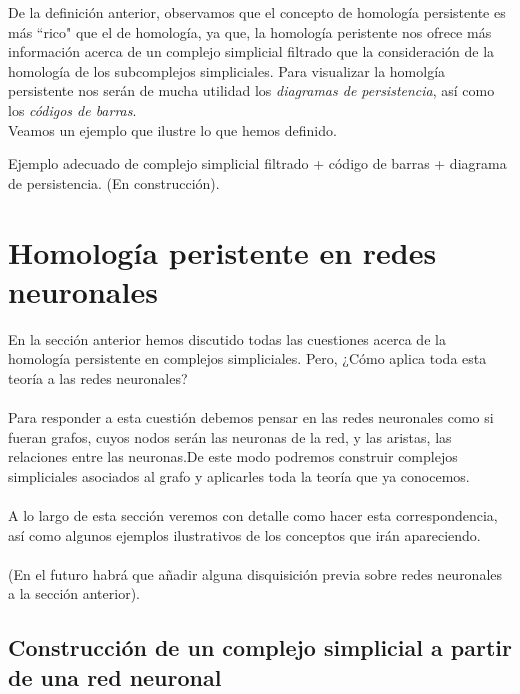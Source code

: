 \documentclass[12pt]{article}
\numberwithin{equation}{section}
\theoremstyle{definition}
\newenvironment{ejem}
  {\pushQED{\qed}\renewcommand{\qedsymbol}{$\blacktriangleleft$}\ejemplo}
  {\popQED\endejemplo}
\theoremstyle{remark}
\theoremstyle{plain}
\begin{document}
		

		De la definición anterior, observamos que el concepto de homología persistente es más ``rico" que el de homología, ya que, la homología peristente nos ofrece más
		información acerca de un complejo simplicial filtrado que la consideración de la homología de los subcomplejos simpliciales. Para visualizar la homolgía persistente
		nos serán de mucha utilidad los \textit{diagramas de persistencia}, así como los \textit{códigos de barras}.\\
		Veamos un ejemplo que ilustre lo que hemos definido.
		
		\begin{ejem}	
			Ejemplo adecuado de complejo simplicial filtrado + código de barras + diagrama de persistencia. (En construcción).
		\end{ejem}

	\section{Homología peristente en redes neuronales}

		En la sección anterior hemos discutido todas las cuestiones 
		acerca de la homología persistente en complejos simpliciales. 
		Pero, ¿Cómo aplica toda esta teoría a las redes neuronales? \\
		\\
		Para responder a esta cuestión debemos pensar en las redes 
		neuronales como si fueran grafos, cuyos nodos serán las neuronas 
		de la red, y las aristas, las relaciones entre las neuronas.De 
		este modo podremos construir complejos simpliciales asociados 
		al grafo y aplicarles toda la teoría que ya conocemos. \\
		\\
		A lo largo de esta sección veremos con detalle como hacer esta 
		correspondencia, así como algunos ejemplos ilustrativos de los 
		conceptos que irán apareciendo.\\
		\\
		(En el futuro habrá que añadir alguna disquisición previa sobre redes neuronales a la sección anterior).

	\subsection{Construcción de un complejo simplicial a partir de una red neuronal}
\end{document}
